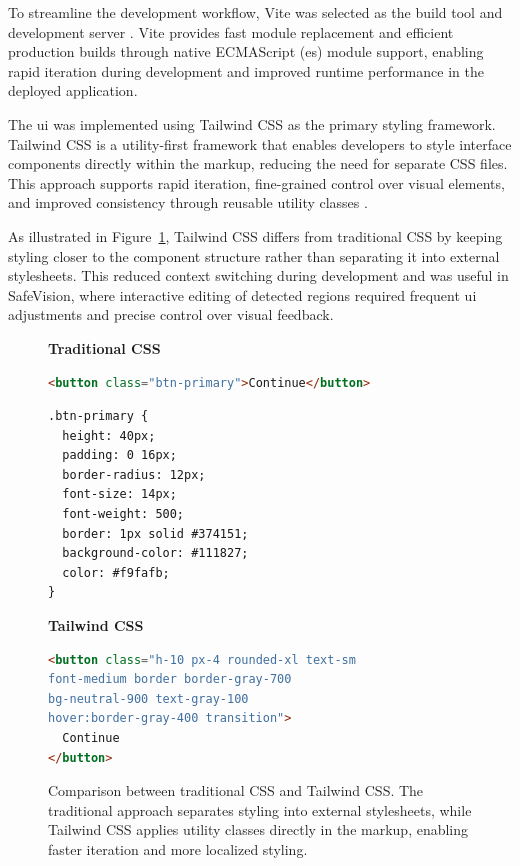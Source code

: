 To streamline the development workflow, Vite was selected as the build tool and development server \cite{vite}. Vite provides fast module replacement and efficient production builds through native ECMAScript (\acrshort{es}) module support, enabling rapid iteration during development and improved runtime performance in the deployed application.


The \acrshort{ui} was implemented using Tailwind CSS as the primary styling framework. Tailwind CSS is a utility-first framework \cite{tailwind_css} that enables developers to style interface components directly within the markup, reducing the need for separate CSS files. This approach supports rapid iteration, fine-grained control over visual elements, and improved consistency through reusable utility classes \cite{utility_first_css}.

As illustrated in Figure~\ref{fig:tailwind_comparison}, Tailwind CSS differs from traditional CSS by keeping styling closer to the component structure rather than separating it into external stylesheets. This reduced context switching during development and was useful in \gls{SafeVision}, where interactive editing of detected regions required frequent \acrshort{ui} adjustments and precise control over visual feedback.

\begin{figure}[htbp]
\centering
\begin{minipage}{0.45\textwidth}
\textbf{Traditional CSS}
\begin{lstlisting}[language=HTML]
<button class="btn-primary">Continue</button>
\end{lstlisting}

\begin{lstlisting}
.btn-primary {
  height: 40px;
  padding: 0 16px;
  border-radius: 12px;
  font-size: 14px;
  font-weight: 500;
  border: 1px solid #374151;
  background-color: #111827;
  color: #f9fafb;
}
\end{lstlisting}
\end{minipage}
\hfill
\begin{minipage}{0.45\textwidth}
\textbf{Tailwind CSS}
\begin{lstlisting}[language=HTML]
<button class="h-10 px-4 rounded-xl text-sm 
font-medium border border-gray-700 
bg-neutral-900 text-gray-100 
hover:border-gray-400 transition">
  Continue
</button>
\end{lstlisting}
\end{minipage}

\caption{Comparison between traditional CSS and Tailwind CSS. The traditional approach separates styling into external stylesheets, while Tailwind CSS applies utility classes directly in the markup, enabling faster iteration and more localized styling.}
\label{fig:tailwind_comparison}
\end{figure}


